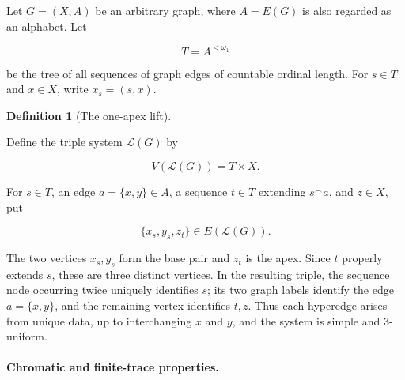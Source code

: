 \documentclass[a4paper,11pt,reqno]{amsart}
\theoremstyle{plain}
\theoremstyle{definition}
\newtheorem{definition}[theorem]{Definition}
\theoremstyle{remark}
\begin{document}
Let \(G=(X,A)\) be an arbitrary graph, where \(A=E(G)\) is also regarded as an alphabet. Let

\[
T=A^{<\omega_1}
\]

be the tree of all sequences of graph edges of countable ordinal length. For \(s\in T\) and \(x\in X\), write \(x_s=(s,x)\).

\begin{definition}[The one-apex lift]\label{definition-6.1-the-one-apex-lift}

Define the triple system \(\mathcal L(G)\) by

\[
V(\mathcal L(G))=T\times X.
\]

For \(s\in T\), an edge \(a=\{x,y\}\in A\), a sequence \(t\in T\) extending \(s^\frown a\), and \(z\in X\), put

\[
\{x_s,y_s,z_t\}\in E(\mathcal L(G)). \tag{6.1}
\]

The two vertices \(x_s,y_s\) form the base pair and \(z_t\) is the apex. Since \(t\) properly extends \(s\), these are three distinct vertices. In the resulting triple, the sequence node occurring twice uniquely identifies \(s\); its two graph labels identify the edge \(a=\{x,y\}\), and the remaining vertex identifies \(t,z\). Thus each hyperedge arises from unique data, up to interchanging \(x\) and \(y\), and the system is simple and \(3\)-uniform.

\end{definition}

\paragraph{Chromatic and finite-trace properties.}\label{chromatic-and-finite-trace-properties}
\end{document}
